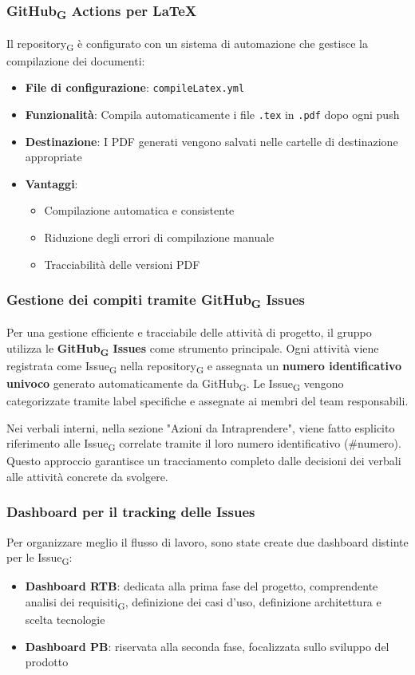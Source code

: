 \documentclass[11pt,a4paper]{article}
\newcommand{\gls}[1]{#1\textsubscript{G}}
\begin{document}
\subsubsection{\gls{GitHub} Actions per LaTeX}
Il \gls{repository} è configurato con un sistema di automazione che gestisce la compilazione dei documenti:

\begin{itemize}
    \item \textbf{File di configurazione}: \texttt{compileLatex.yml}
    \item \textbf{Funzionalità}: Compila automaticamente i file \texttt{.tex} in \texttt{.pdf} dopo ogni push
    \item \textbf{Destinazione}: I PDF generati vengono salvati nelle cartelle di destinazione appropriate
    \item \textbf{Vantaggi}:
    \begin{itemize}
        \item Compilazione automatica e consistente
        \item Riduzione degli errori di compilazione manuale
        \item Tracciabilità delle versioni PDF
    \end{itemize}
\end{itemize}

\subsubsection{Gestione dei compiti tramite \gls{GitHub} Issues}
Per una gestione efficiente e tracciabile delle attività di progetto, il gruppo utilizza le \textbf{\gls{GitHub} Issues} come strumento principale. Ogni attività viene registrata come \gls{Issue} nella \gls{repository} e assegnata un \textbf{numero identificativo univoco} generato automaticamente da \gls{GitHub}. Le \gls{Issue} vengono categorizzate tramite label specifiche e assegnate ai membri del team responsabili.

Nei verbali interni, nella sezione "Azioni da Intraprendere", viene fatto esplicito riferimento alle \gls{Issue} correlate tramite il loro numero identificativo (\#numero). Questo approccio garantisce un tracciamento completo dalle decisioni dei verbali alle attività concrete da svolgere.


\subsubsection{Dashboard per il tracking delle Issues}
Per organizzare meglio il flusso di lavoro, sono state create due dashboard distinte per le \gls{Issue}:
\begin{itemize}
    \item \textbf{Dashboard RTB}: dedicata alla prima fase del progetto, comprendente \gls{analisi dei requisiti}, definizione dei casi d'uso, definizione architettura e scelta tecnologie
    
    \item \textbf{Dashboard PB}: riservata alla seconda fase, focalizzata sullo sviluppo del prodotto
\end{itemize}
\end{document}
